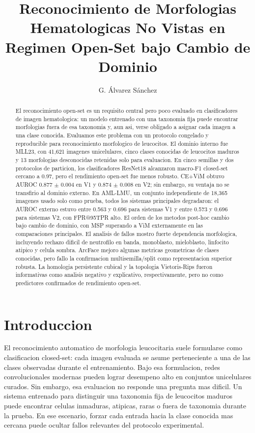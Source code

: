 \documentclass[11pt]{article}
\title{Reconocimiento de Morfologias Hematologicas No Vistas en Regimen Open-Set bajo Cambio de Dominio}
\author{G. Álvarez Sánchez}
\date{}
\begin{document}
\maketitle

\begin{abstract}
El reconocimiento open-set es un requisito central pero poco evaluado en clasificadores de imagen hematologica: un modelo entrenado con una taxonomia fija puede encontrar morfologias fuera de esa taxonomia y, aun asi, verse obligado a asignar cada imagen a una clase conocida. Evaluamos este problema con un protocolo congelado y reproducible para reconocimiento morfologico de leucocitos. El dominio interno fue MLL23, con 41,621 imagenes unicelulares, cinco clases conocidas de leucocitos maduros y 13 morfologias desconocidas retenidas solo para evaluacion. En cinco semillas y dos protocolos de particion, los clasificadores ResNet18 alcanzaron macro-F1 closed-set cercano a 0.97, pero el rendimiento open-set fue menos robusto. CE+ViM obtuvo AUROC 0.877 $\pm$ 0.004 en V1 y 0.874 $\pm$ 0.008 en V2; sin embargo, su ventaja no se transfirio al dominio externo. En AML-LMU, un conjunto independiente de 18,365 imagenes usado solo como prueba, todos los sistemas principales degradaron: el AUROC externo estuvo entre 0.563 y 0.696 para sistemas V1 y entre 0.573 y 0.696 para sistemas V2, con FPR@95TPR alto. El orden de los metodos post-hoc cambio bajo cambio de dominio, con MSP superando a ViM externamente en las comparaciones principales. El analisis de fallos mostro fuerte dependencia morfologica, incluyendo rechazo dificil de neutrofilo en banda, monoblasto, mieloblasto, linfocito atipico y celula sombra. ArcFace mejoro algunas metricas geometricas de clases conocidas, pero fallo la confirmacion multisemilla/split como representacion superior robusta. La homologia persistente cubical y la topologia Vietoris-Rips fueron informativas como analisis negativo y explicativo, respectivamente, pero no como predictores confirmados de rendimiento open-set.
\end{abstract}

\section{Introduccion}

El reconocimiento automatico de morfologia leucocitaria suele formularse como clasificacion closed-set: cada imagen evaluada se asume perteneciente a una de las clases observadas durante el entrenamiento. Bajo esa formulacion, redes convolucionales modernas pueden lograr desempeno alto en conjuntos unicelulares curados. Sin embargo, esa evaluacion no responde una pregunta mas dificil. Un sistema entrenado para distinguir una taxonomia fija de leucocitos maduros puede encontrar celulas inmaduras, atipicas, raras o fuera de taxonomia durante la prueba. En ese escenario, forzar cada entrada hacia la clase conocida mas cercana puede ocultar fallos relevantes del protocolo experimental.
\end{document}
